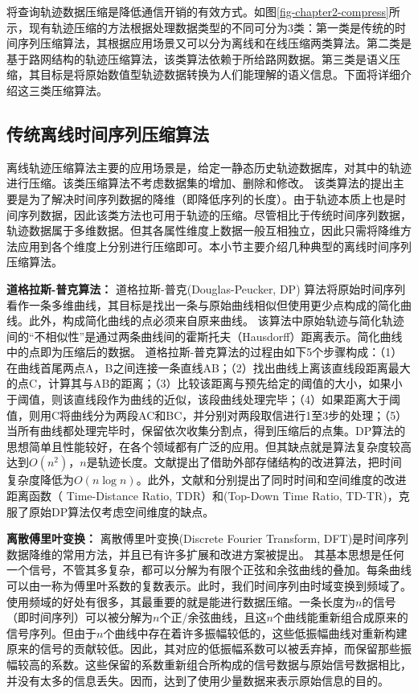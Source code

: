 将查询轨迹数据压缩是降低通信开销的有效方式。如图\ref{fig-chapter2-compress}所示，现有轨迹压缩的方法根据处理数据类型的不同可分为3类\cite{jiang}：第一类是传统的时间序列压缩算法，其根据应用场景又可以分为离线和在线压缩两类算法。第二类是基于路网结构的轨迹压缩算法，该类算法依赖于所给路网数据。第三类是语义压缩，其目标是将原始数值型轨迹数据转换为人们能理解的语义信息。下面将详细介绍这三类压缩算法。


\subsection{传统离线时间序列压缩算法}
离线轨迹压缩算法主要的应用场景是，给定一静态历史轨迹数据库，对其中的轨迹进行压缩。该类压缩算法不考虑数据集的增加、删除和修改。
该类算法的提出主要是为了解决时间序列数据的降维（即降低序列的长度）。由于轨迹本质上也是时间序列数据，因此该类方法也可用于轨迹的压缩。尽管相比于传统时间序列数据，轨迹数据属于多维数据。但其各属性维度上数据一般互相独立，因此只需将降维方法应用到各个维度上分别进行压缩即可。本小节主要介绍几种典型的离线时间序列压缩算法。

\textbf{道格拉斯-普克算法：}
道格拉斯-普克(Douglas-Peucker, DP) 算法将原始时间序列看作一条多维曲线，其目标是找出一条与原始曲线相似但使用更少点构成的简化曲线。此外，构成简化曲线的点必须来自原来曲线。
该算法中原始轨迹与简化轨迹间的“不相似性”是通过两条曲线间的霍斯托夫（Hausdorff）距离表示。简化曲线中的点即为压缩后的数据。
道格拉斯-普克算法的过程由如下5个步骤构成：（1）在曲线首尾两点A，B之间连接一条直线AB；（2）找出曲线上离该直线段距离最大的点C，计算其与AB的距离；（3）比较该距离与预先给定的阈值的大小，如果小于阈值，则该直线段作为曲线的近似，该段曲线处理完毕；（4）如果距离大于阈值，则用C将曲线分为两段AC和BC，并分别对两段取信进行1至3步的处理；（5）当所有曲线都处理完毕时，保留依次收集分割点，得到压缩后的点集。DP算法的思想简单且性能较好，在各个领域都有广泛的应用。但其缺点就是算法复杂度较高达到$O(n^2)$，$n$是轨迹长度。文献\cite{DPSpeeding}提出了借助外部存储结构的改进算法，把时间复杂度降低为$O(n\log n)$。此外，文献\cite{MeratniaB04}和\cite{LiuZSSKJ15}分别提出了同时时间和空间维度的改进距离函数（ Time-Distance Ratio, TDR）和(Top-Down Time Ratio, TD-TR)，克服了原始DP算法仅考虑空间维度的缺点。

\textbf{离散傅里叶变换：}
离散傅里叶变换(Discrete Fourier Transform, DFT)\cite{DFT}是时间序列数据降维的常用方法，并且已有许多扩展和改进方案被提出\cite{fastDFT,rafiei1997similarity,rafiei1999on}。
其基本思想是任何一个信号，不管其多复杂，都可以分解为有限个正弦和余弦曲线的叠加。每条曲线可以由一称为傅里叶系数的复数表示\cite{Shatkay1995The}。此时，我们时间序列由时域变换到频域了。使用频域的好处有很多，其最重要的就是能进行数据压缩。一条长度为$n$的信号（即时间序列）可以被分解为$n$个正/余弦曲线，且这$n$个曲线能重新组合成原来的信号序列。但由于$n$个曲线中存在着许多振幅较低的，这些低振幅曲线对重新构建原来的信号的贡献较低。因此，其对应的低振幅系数可以被丢弃掉，而保留那些振幅较高的系数。这些保留的系数重新组合所构成的信号数据与原始信号数据相比，并没有太多的信息丢失。因而，达到了使用少量数据来表示原始信息的目的。

